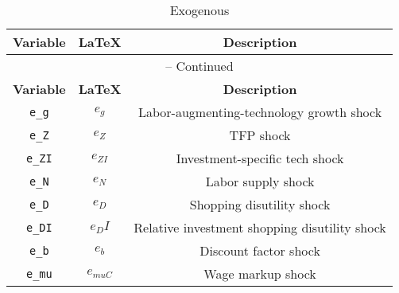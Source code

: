\begin{center}
\begin{longtable}{ccc}
\caption{Exogenous}\\%
\hline%
\multicolumn{1}{c}{\textbf{Variable}} &
\multicolumn{1}{c}{\textbf{\LaTeX}} &
\multicolumn{1}{c}{\textbf{Description}}\\%
\hline\hline%
\endfirsthead
\multicolumn{3}{c}{{\tablename} \thetable{} -- Continued}\\%
\hline%
\multicolumn{1}{c}{\textbf{Variable}} &
\multicolumn{1}{c}{\textbf{\LaTeX}} &
\multicolumn{1}{c}{\textbf{Description}}\\%
\hline\hline%
\endhead
\texttt{e\_g} & ${e_g}$ & Labor-augmenting-technology growth shock\\
\texttt{e\_Z} & ${e_Z}$ & TFP shock\\
\texttt{e\_ZI} & ${e_{ZI}}$ & Investment-specific tech shock\\
\texttt{e\_N} & ${e_N}$ & Labor supply shock\\
\texttt{e\_D} & ${e_D}$ & Shopping disutility shock\\
\texttt{e\_DI} & ${e_DI}$ & Relative investment shopping disutility shock\\
\texttt{e\_b} & ${e_b}$ & Discount factor shock\\
\texttt{e\_mu} & ${e_{muC}}$ & Wage markup shock\\
\hline%
\end{longtable}
\end{center}
